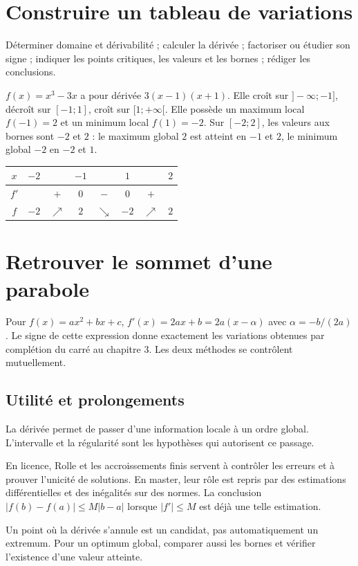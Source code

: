 \documentclass[../cours_1re.tex]{subfiles}
\begin{document}
\section{Construire un tableau de variations}
\begin{methode}
Déterminer domaine et dérivabilité ; calculer la dérivée ; factoriser ou étudier son signe ; indiquer les points critiques, les valeurs et les bornes ; rédiger les conclusions.
\end{methode}
\begin{exemple}
$f(x)=x^3-3x$ a pour dérivée $3(x-1)(x+1)$.
Elle croît sur $]-\infty;-1]$, décroît sur $[-1;1]$, croît sur $[1;+\infty[$.
Elle possède un maximum local $f(-1)=2$ et un minimum local $f(1)=-2$.
Sur $[-2;2]$, les valeurs aux bornes sont $-2$ et $2$ : le maximum global $2$ est atteint en $-1$ et $2$, le minimum global $-2$ en $-2$ et $1$.
\end{exemple}
\begin{center}\begin{tabular}{c|ccccccc}
$x$&$-2$&&$-1$&&$1$&&$2$\\\hline
$f'$&&$+$&$0$&$-$&$0$&$+$&\\
$f$&$-2$&$\nearrow$&$2$&$\searrow$&$-2$&$\nearrow$&$2$
\end{tabular}\end{center}
\section{Retrouver le sommet d'une parabole}
Pour $f(x)=ax^2+bx+c$, $f'(x)=2ax+b=2a(x-\alpha)$ avec $\alpha=-b/(2a)$.
Le signe de cette expression donne exactement les variations obtenues par complétion du carré au chapitre 3. Les deux méthodes se contrôlent mutuellement.

\begin{finchapitre}
\section{Utilité et prolongements}
La dérivée permet de passer d'une information locale à un ordre global. L'intervalle et la régularité sont les hypothèses qui autorisent ce passage.

En licence, Rolle et les accroissements finis servent à contrôler les erreurs et à prouver l'unicité de solutions. En master, leur rôle est repris par des estimations différentielles et des inégalités sur des normes. La conclusion $|f(b)-f(a)|\le M|b-a|$ lorsque $|f'|\le M$ est déjà une telle estimation.
\begin{retenir}
Un point où la dérivée s'annule est un candidat, pas automatiquement un extremum. Pour un optimum global, comparer aussi les bornes et vérifier l'existence d'une valeur atteinte.
\end{retenir}
\end{finchapitre}
\end{document}
